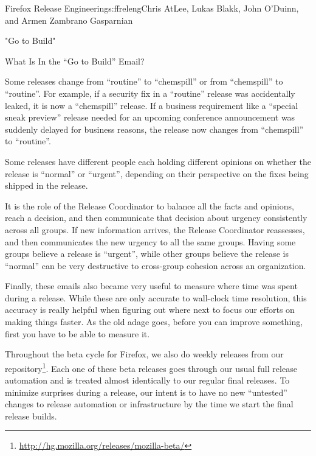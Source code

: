 \begin{aosachapter}{Firefox Release Engineering}{s:ffreleng}{Chris AtLee, Lukas Blakk, John O'Duinn, and Armen Zambrano Gasparnian}
\begin{aosasect1}{"Go to Build"}
\begin{aosasect2}{What Is In the ``Go to Build'' Email?}
\begin{aosaenumerate}
\begin{aosaenumerate}
    \item Some releases change from ``routine'' to ``chemspill'' or
      from ``chemspill'' to ``routine''. For example, if a security
      fix in a ``routine'' release was accidentally leaked, it is now
      a ``chemspill'' release. If a business requirement like a
      ``special sneak preview'' release needed for an upcoming
      conference announcement was suddenly delayed for business
      reasons, the release now changes from ``chemspill'' to
      ``routine''.

    \item Some releases have different people each holding different
      opinions on whether the release is ``normal'' or ``urgent'',
      depending on their perspective on the fixes being shipped in the
      release.

  \end{aosaenumerate}

\end{aosaenumerate}

It is the role of the Release Coordinator to balance all the facts and
opinions, reach a decision, and then communicate that decision about
urgency consistently across all groups. If new information arrives,
the Release Coordinator reassesses, and then communicates the new
urgency to all the same groups. Having some groups believe a release
is ``urgent'', while other groups believe the release is ``normal''
can be very destructive to cross-group cohesion across an
organization.

Finally, these emails also became very useful to measure where time
was spent during a release.  While these are only accurate to
wall-clock time resolution, this accuracy is really helpful when
figuring out where next to focus our efforts on making things faster.
As the old adage goes, before you can improve something, first you
have to be able to measure it.

Throughout the beta cycle for Firefox, we also do weekly releases from
our 
repository\footnote{\url{http://hg.mozilla.org/releases/mozilla-beta/}}. Each
one of these beta releases goes through our usual full release
automation and is treated almost identically to our regular final
releases. To minimize surprises during a release, our intent is to
have no new ``untested'' changes to release automation or
infrastructure by the time we start the final release builds.

\end{aosasect2}


\end{aosasect1}
\end{aosachapter}
